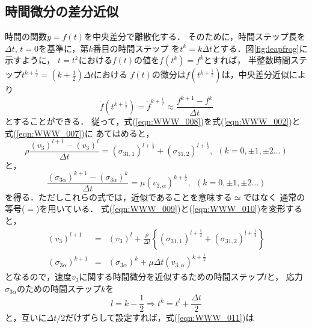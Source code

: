 \subsection{時間微分の差分近似}
時間の関数$y=f(t)$を中央差分で離散化する．
そのために，時間ステップ長を$\Delta t$, $t=0$を基準に，第$k$番目の時間ステップ
を$t^k=k\Delta t$とする．図\ref{fig:leapfrog}に示すように，
$t=t^k$における$f(t)$の値を$f(t^{k})=f^k$とすれば，
半整数時間ステップ$t^{k+\frac{1}{2}}=(k+\frac{1}{2})\Delta t$における
$f(t)$の微分は$\dot f(t^{k+\frac{1}{2}})$は，中央差分近似により
\begin{equation}
	\dot{f}(t^{k+\frac{1}{2}})
	=\dot{f}^{k+\frac{1}{2}} \approx \frac{ f^{k+1}-f^k}{\Delta t}
	\label{eqn:WWW_008}
\end{equation}
とすることができる．
従って，式(\ref{eqn:WWW_008})を式(\ref{eqn:WWW_002})と式(\ref{eqn:WWW_007})に
あてはめると，
\begin{equation}
	\rho \frac{ (v_3)^{l+1}-(v_3)^l}{\Delta t}
	=
	(\sigma_{31,1})^{l+\frac{1}{2}}
	+
	(\sigma_{31,2})^{l+\frac{1}{2}}, 
	\ \ (k=0,\pm 1, \pm 2\dots )
	\label{eqn:WWW_009}
\end{equation}
と，
\begin{equation}
	\frac{ (\sigma_{3\alpha})^{k+1}-(\sigma_{3\alpha})^k}{\Delta t}
	=
	\mu (v_{3,\alpha})^{k+\frac{1}{2}},
	\ \ (k=0,\pm 1, \pm 2\dots )
	\label{eqn:WWW_010}
\end{equation}
を得る．ただしこれらの式では，近似であることを意味する$\simeq$ではなく
通常の等号($=$)を用いている．
式(\ref{eqn:WWW_009})と(\ref{eqn:WWW_010})を変形すると，
\begin{eqnarray}
	(v_3)^{l+1} &=& 
	(v_3)^l
	+
	\frac{\rho}{\Delta t} \left\{
	(\sigma_{31,1})^{l+\frac{1}{2}} + (\sigma_{31,2})^{l+\frac{1}{2}}
	\right\} 
	\label{eqn:WWW_011}
	\\
	(\sigma_{3\alpha})^{k+1} &=& 
	(\sigma_{3\alpha})^{k} 
	+
	\mu \Delta t (v_{3,\alpha})^{k+\frac{1}{2}}
	\label{eqn:WWW_012}
\end{eqnarray}
となるので，速度$v_3$に関する時間微分を近似するための時間ステップ$l$と，
応力$\sigma_{3\alpha}$のための時間ステップ$k$を
\begin{equation}
	l=k-\frac{1}{2} \Rightarrow t^k=t^l+\frac{\Delta t}{2}
	\label{eqn:WWW_013}
\end{equation}
と，互いに$\Delta t/2$だけずらして設定すれば，式(\ref{eqn:WWW_011})は

